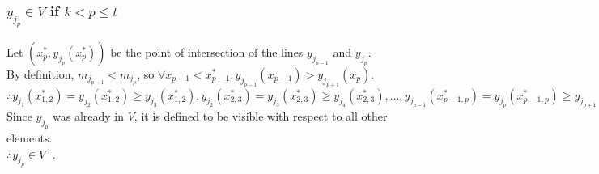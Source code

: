\documentclass{article}
\begin{document}
\subsubsection{$y_{j_p} \in V$ if $k < p \leq t$}


Let $(x^*_p, y_{j_p}(x^*_p))$ be the point of intersection of the lines $y_{j_{p-1}}$ and $y_{j_{p}}$.\\
By definition, $m_{j_{p-1}} < m_{j_{p}}$, so $\forall x_{p-1} < x^*_{p-1}, y_{j_{p-1}} (x_{p-1}) > y_{j_{p+1}} (x_p)$.\\
$\therefore y_{j_{1}}(x^*_{1,2}) = y_{j_{2}}(x^*_{1,2}) \geq y_{j_3}(x^*_{1,2}), y_{j_{2}}(x^*_{2,3}) = y_{j_{3}}(x^*_{2,3}) \geq y_{j_4}(x^*_{2,3}), ..., y_{j_{p-1}}(x^*_{p-1,p}) = y_{j_{p}}(x^*_{p-1,p}) \geq y_{j_{p+1}}(x^*_{p-1,p}), ..., y_{j_{k-1}}(x^*_{k-1,k}) = y_{j_{k}}(x^*_{k-1,k}) \geq y_{j_{i}}(x^*_{k-1,k})$\\
Since $y_{j_p}$ was already in $V$, it is defined to be visible with respect to all other elements.\\
$\therefore y_{j_p} \in V^+$.
\end{document}
